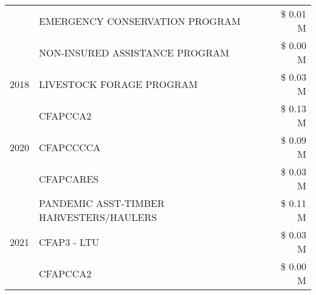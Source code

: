 \begin{tabular}{llr}
 & EMERGENCY CONSERVATION PROGRAM & \$ 0.01 M \\
 & NON-INSURED ASSISTANCE PROGRAM & \$ 0.00 M \\
\cline{1-3}
2018 & LIVESTOCK FORAGE PROGRAM & \$ 0.03 M \\
\cline{1-3}
\multirow[t]{3}{*}{2020} & CFAPCCA2 & \$ 0.13 M \\
 & CFAPCCCCA & \$ 0.09 M \\
 & CFAPCARES & \$ 0.03 M \\
\cline{1-3}
\multirow[t]{3}{*}{2021} & PANDEMIC ASST-TIMBER HARVESTERS/HAULERS & \$ 0.11 M \\
 & CFAP3 - LTU & \$ 0.03 M \\
 & CFAPCCA2 & \$ 0.00 M \\
\cline{1-3}
\bottomrule
\end{tabular}
